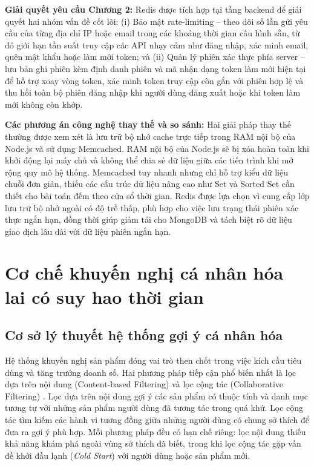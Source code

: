 \documentclass[../DoAn.tex]{subfiles}
\begin{document}
\textbf{Giải quyết yêu cầu Chương 2:}
Redis được tích hợp tại tầng backend để giải quyết hai nhóm vấn đề cốt lõi: (i) Bảo mật rate-limiting -- theo dõi số lần gửi yêu cầu của từng địa chỉ IP hoặc email trong các khoảng thời gian cấu hình sẵn, từ đó giới hạn tần suất truy cập các API nhạy cảm như đăng nhập, xác minh email, quên mật khẩu hoặc làm mới token; và (ii) Quản lý phiên xác thực phía server -- lưu bản ghi phiên kèm định danh phiên và mã nhận dạng token làm mới hiện tại để hỗ trợ xoay vòng token, xác minh token truy cập còn gắn với phiên hợp lệ và thu hồi toàn bộ phiên đăng nhập khi người dùng đăng xuất hoặc khi token làm mới không còn khớp.

\textbf{Các phương án công nghệ thay thế và so sánh:}
Hai giải pháp thay thế thường được xem xét là lưu trữ bộ nhớ cache trực tiếp trong RAM nội bộ của Node.js và sử dụng Memcached. RAM nội bộ của Node.js sẽ bị xóa hoàn toàn khi khởi động lại máy chủ và không thể chia sẻ dữ liệu giữa các tiến trình khi mở rộng quy mô hệ thống. Memcached tuy nhanh nhưng chỉ hỗ trợ kiểu dữ liệu chuỗi đơn giản, thiếu các cấu trúc dữ liệu nâng cao như Set và Sorted Set cần thiết cho bài toán đếm theo cửa sổ thời gian. Redis được lựa chọn vì cung cấp lớp lưu trữ bộ nhớ ngoài có độ trễ thấp, phù hợp cho việc lưu trạng thái phiên xác thực ngắn hạn, đồng thời giúp giảm tải cho MongoDB và tách biệt rõ dữ liệu giao dịch lâu dài với dữ liệu phiên ngắn hạn.

\section{Cơ chế khuyến nghị cá nhân hóa lai có suy hao thời gian}
\label{section:3.4}

\subsection{Cơ sở lý thuyết hệ thống gợi ý cá nhân hóa}
Hệ thống khuyến nghị sản phẩm đóng vai trò then chốt trong việc kích cầu tiêu dùng và tăng trưởng doanh số. Hai phương pháp tiếp cận phổ biến nhất là lọc dựa trên nội dung (Content-based Filtering) và lọc cộng tác (Collaborative Filtering) \cite{recommender-systems}. Lọc dựa trên nội dung gợi ý các sản phẩm có thuộc tính và danh mục tương tự với những sản phẩm người dùng đã tương tác trong quá khứ. Lọc cộng tác tìm kiếm các hành vi tương đồng giữa những người dùng có chung sở thích để đưa ra gợi ý phù hợp. Mỗi phương pháp đều có hạn chế riêng: lọc nội dung thiếu khả năng khám phá ngoài vùng sở thích đã biết, trong khi lọc cộng tác gặp vấn đề khởi đầu lạnh (\textit{Cold Start}) với người dùng hoặc sản phẩm mới.
\end{document}

